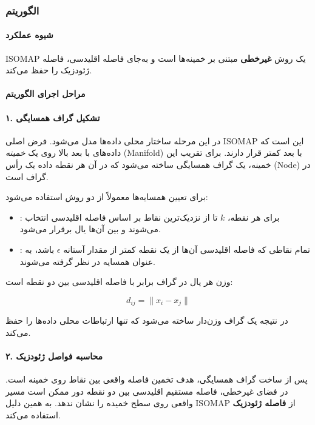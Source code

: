 \documentclass{article}
\begin{document}

\subsubsection{الگوریتم }

\paragraph{شیوه عملکرد}
ISOMAP یک روش \textbf{غیرخطی} مبتنی بر خمینه‌ها است و به‌جای فاصله اقلیدسی، فاصله ژئودزیک را حفظ می‌کند.

\paragraph{مراحل اجرای الگوریتم }

\paragraph{۱. تشکیل گراف همسایگی}
در این مرحله ساختار محلی داده‌ها مدل می‌شود. فرض اصلی ISOMAP این است که داده‌های با بعد بالا روی یک \textit{خمینه} (Manifold) با بعد کمتر قرار دارند. برای تقریب این خمینه، یک گراف همسایگی ساخته می‌شود که در آن هر نقطه داده یک رأس (Node) در گراف است.

برای تعیین همسایه‌ها معمولاً از دو روش استفاده می‌شود:

\begin{itemize}
	\item {}: برای هر نقطه، \(k\) تا از نزدیک‌ترین نقاط بر اساس فاصله اقلیدسی انتخاب می‌شوند و بین آن‌ها یال برقرار می‌شود.
	\item {}: تمام نقاطی که فاصله اقلیدسی آن‌ها از یک نقطه کمتر از مقدار آستانه \(\epsilon\) باشد، به عنوان همسایه در نظر گرفته می‌شوند.
\end{itemize}

وزن هر یال در گراف برابر با فاصله اقلیدسی بین دو نقطه است:

\[
d_{ij} = \|x_i - x_j\|
\]

در نتیجه یک گراف وزن‌دار ساخته می‌شود که تنها ارتباطات محلی داده‌ها را حفظ می‌کند.

\paragraph{۲. محاسبه فواصل ژئودزیک}
پس از ساخت گراف همسایگی، هدف تخمین فاصله واقعی بین نقاط روی خمینه است. در فضای غیرخطی، فاصله مستقیم اقلیدسی بین دو نقطه دور ممکن است مسیر واقعی روی سطح خمیده را نشان ندهد. به همین دلیل ISOMAP از \textbf{فاصله ژئودزیک} استفاده می‌کند.
\end{document}
